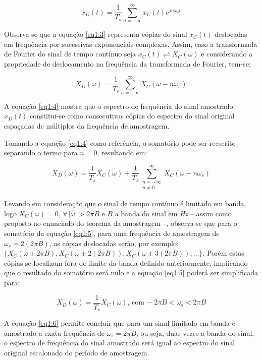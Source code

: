 \begin{equation} \label{eq1:3}
    x_D(t) = \frac{1}{T_s} \sum_{n=-\infty}^{\infty} x_C(t) e^{jn\omega_s t}
\end{equation}

Observa-se que a equação \ref{eq1:3} representa cópias do sinal $x_C(t)$ deslocadas em frequência por sucessivas exponenciais complexas. Assim, caso a transformada de Fourier do sinal de tempo contínuo seja $x_C(t) \rightleftharpoons X_C(\omega)$ e considerando a propriedade de deslocamento na frequência da transformada de Fourier, tem-se:

\begin{equation} \label{eq1:4}
    X_D(\omega) = \frac{1}{T_s} \sum_{n=-\infty}^{\infty} X_C(\omega - n\omega_s)
\end{equation}

A equação \ref{eq1:4} mostra que o espectro de frequência do sinal amostrado $x_D(t)$ constitui-se como consecutivas cópias do espectro do sinal original espaçadas de múltiplos da frequência de amostragem.

Tomando a equação \ref{eq1:4} como referência, o somatório pode ser reescrito separando o termo para $n=0$, resultando em:

\begin{equation} \label{eq1:5}
    X_D(\omega) = \frac{1}{T_s} X_C(\omega) + \frac{1}{T_s} \sum_{\substack{n=-\infty \\ n \neq 0}}^{\infty} X_C(\omega - n\omega_s)
\end{equation}

Levando em consideração que o sinal de tempo contínuo é limitado em banda, logo $X_C(\omega)=0, \, \forall \, |\omega|>2\pi B$ e $B$ a banda do sinal em \textit{Hz} -- assim como proposto no enunciado do teorema da amostragem --, observa-se que para o somatório da equação \ref{eq1:5}, para uma frequência de amostragem de $\omega_s = 2(2\pi B)$, as cópias deslocadas serão, por exemplo: $\{X_C(\omega \pm 2\pi B), X_C(\omega \pm 2(2\pi B)), X_C(\omega \pm 3(2\pi B)), ...\}$. Porém estas cópias se localizam fora do limite da banda definido anteriormente, implicando que o resultado do somatório será nulo e a equação \ref{eq1:5} poderá ser simplificada para:

\begin{equation} \label{eq1:6}
    X_D(\omega) = \frac{1}{T_s} X_C(\omega), \, \text{com} \, -2\pi B<\omega_s < 2\pi B
\end{equation}

A equação \ref{eq1:6} permite concluir que para um sinal limitado em banda e amostrado a exata frequência de $\omega_s = 2\pi B$, ou seja, duas vezes a banda do sinal, o espectro de frequência do sinal amostrado será igual ao espectro do sinal original escalonado do período de amostragem. 

